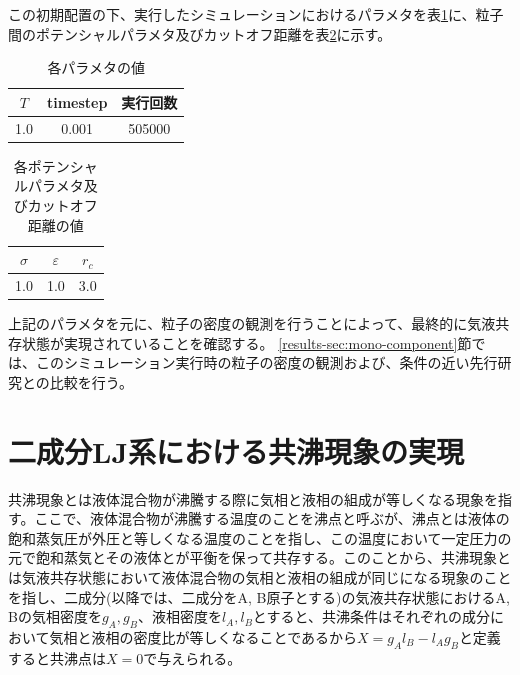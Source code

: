 \documentclass[titlepage]{jsreport}
\begin{document}
この初期配置の下、実行したシミュレーションにおけるパラメタを表\ref{table:mono-component-parameter}に、粒子間のポテンシャルパラメタ及びカットオフ距離を表\ref{table:mono-component-potential-parameter}に示す。

\begin{table}[htbp]
    \begin{center}
        \caption{各パラメタの値}
        \label{table:mono-component-parameter}
            \begin{tabular}{c c c}
                $T$ & timestep & 実行回数 \\
                \hline
                1.0 & 0.001 & 505000 \\
            \end{tabular}
    \end{center}
\end{table}

\begin{table}[htbp]
    \begin{center}
        \caption{各ポテンシャルパラメタ及びカットオフ距離の値}
        \label{table:mono-component-potential-parameter}
            \begin{tabular}{c c c}
                $\sigma$ & $\varepsilon$ & $r_c$ \\
                \hline
                1.0 & 1.0 & 3.0\\
            \end{tabular}
    \end{center}
\end{table}

上記のパラメタを元に、粒子の密度の観測を行うことによって、最終的に気液共存状態が実現されていることを確認する。
\ref{results-sec:mono-component}節では、このシミュレーション実行時の粒子の密度の観測および、条件の近い先行研究との比較を行う。


\section{二成分LJ系における共沸現象の実現} \label{method-sec:bi-component-azeotrope}
共沸現象とは液体混合物が沸騰する際に気相と液相の組成が等しくなる現象を指す。ここで、液体混合物が沸騰する温度のことを沸点と呼ぶが、沸点とは液体の飽和蒸気圧が外圧と等しくなる温度のことを指し\cite{boiling-point}、この温度において一定圧力の元で飽和蒸気とその液体とが平衡を保って共存する。このことから、共沸現象とは気液共存状態において液体混合物の気相と液相の組成が同じになる現象のことを指し、二成分(以降では、二成分をA, B原子とする)の気液共存状態におけるA, Bの気相密度を$g_A, g_B$、液相密度を$l_A, l_B$とすると、共沸条件はそれぞれの成分において気相と液相の密度比が等しくなることであるから$X=g_Al_B-l_Ag_B$と定義すると共沸点は$X=0$で与えられる。
\end{document}
